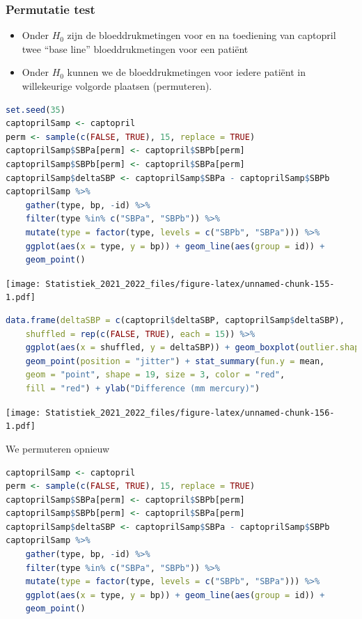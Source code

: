 \documentclass[
  12pt,dutch,coursenotes]{book}
\theoremstyle{definition}
\theoremstyle{definition}
\theoremstyle{definition}
\theoremstyle{definition}
\theoremstyle{remark}
\begin{document}
\hypertarget{permutatie-test}{%
\subsubsection{Permutatie test}\label{permutatie-test}}

\begin{itemize}
\item
  Onder \(H_0\) zijn de bloeddrukmetingen voor en na toediening van captopril twee ``base line'' bloeddrukmetingen voor een patiënt
\item
  Onder \(H_0\) kunnen we de bloeddrukmetingen voor iedere patiënt in willekeurige volgorde plaatsen (permuteren).
\end{itemize}

\begin{lstlisting}[language=R]
set.seed(35)
captoprilSamp <- captopril
perm <- sample(c(FALSE, TRUE), 15, replace = TRUE)
captoprilSamp$SBPa[perm] <- captopril$SBPb[perm]
captoprilSamp$SBPb[perm] <- captopril$SBPa[perm]
captoprilSamp$deltaSBP <- captoprilSamp$SBPa - captoprilSamp$SBPb
captoprilSamp %>%
    gather(type, bp, -id) %>%
    filter(type %in% c("SBPa", "SBPb")) %>%
    mutate(type = factor(type, levels = c("SBPb", "SBPa"))) %>%
    ggplot(aes(x = type, y = bp)) + geom_line(aes(group = id)) +
    geom_point()
\end{lstlisting}

\texttt{[image: Statistiek\_2021\_2022\_files/figure-latex/unnamed-chunk-155-1.pdf]}

\begin{lstlisting}[language=R]
data.frame(deltaSBP = c(captopril$deltaSBP, captoprilSamp$deltaSBP),
    shuffled = rep(c(FALSE, TRUE), each = 15)) %>%
    ggplot(aes(x = shuffled, y = deltaSBP)) + geom_boxplot(outlier.shape = NA) +
    geom_point(position = "jitter") + stat_summary(fun.y = mean,
    geom = "point", shape = 19, size = 3, color = "red",
    fill = "red") + ylab("Difference (mm mercury)")
\end{lstlisting}

\texttt{[image: Statistiek\_2021\_2022\_files/figure-latex/unnamed-chunk-156-1.pdf]}

We permuteren opnieuw

\begin{lstlisting}[language=R]
captoprilSamp <- captopril
perm <- sample(c(FALSE, TRUE), 15, replace = TRUE)
captoprilSamp$SBPa[perm] <- captopril$SBPb[perm]
captoprilSamp$SBPb[perm] <- captopril$SBPa[perm]
captoprilSamp$deltaSBP <- captoprilSamp$SBPa - captoprilSamp$SBPb
captoprilSamp %>%
    gather(type, bp, -id) %>%
    filter(type %in% c("SBPa", "SBPb")) %>%
    mutate(type = factor(type, levels = c("SBPb", "SBPa"))) %>%
    ggplot(aes(x = type, y = bp)) + geom_line(aes(group = id)) +
    geom_point()
\end{lstlisting}
\end{document}
